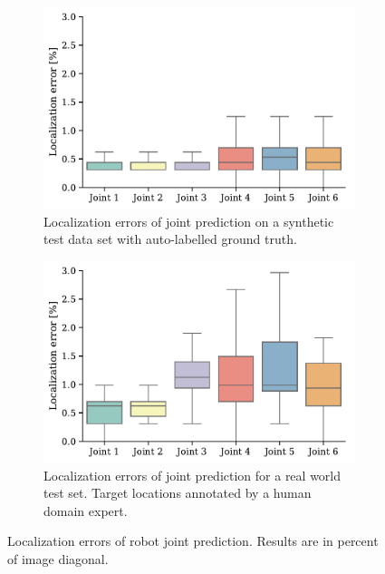 \documentclass[conference]{IEEEtran}
\begin{document}
    \begin{figure}[!h]
        \centering
        \begin{subfigure}[t]{0.49\columnwidth}
            \includegraphics[width=\columnwidth]{figures/results/pixel_errors/pixel_error_synth.pdf}
            \caption {
                \label{fig:locationerror_synth} 
                Localization errors of joint prediction on a synthetic test data set with auto-labelled ground truth.
            }
        \end{subfigure}
        \begin{subfigure}[t]{0.49\columnwidth}
            \includegraphics[width=\columnwidth]{figures/results/pixel_errors/pixel_error_real.pdf}
            \caption {
                \label{fig:locationerror_real} 
                Localization errors of joint prediction for a real world test set. Target locations annotated by a human domain expert. 
            }
        \end{subfigure}
        \caption {
            \label{fig:pixelerror} 
            Localization errors of robot joint prediction. Results are in percent of image diagonal.
        }
    \end{figure}
\end{document}
